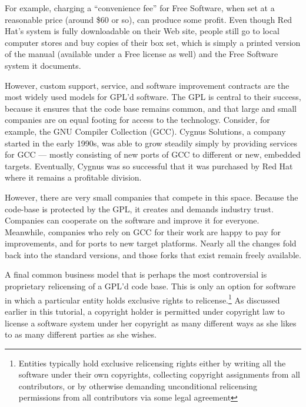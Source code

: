 For example, charging a ``convenience fee'' for Free Software,
when set at a reasonable price (around \$60 or so), can produce some
profit. Even though Red Hat's system is fully downloadable on their
Web site, people still go to local computer stores and buy copies of their
box set, which is simply a printed version of the manual (available under
a Free license as well) and the Free Software system it documents.

\medskip

However, custom support, service, and software improvement contracts
are the most widely used models for GPL'd software. The GPL is
central to their success, because it ensures that the code base
remains common, and that large and small companies are on equal
footing for access to the technology. Consider, for example, the GNU
Compiler Collection (GCC). Cygnus Solutions, a company started in the
early 1990s, was able to grow steadily simply by providing services
for GCC --- mostly consisting of new ports of GCC to different or new,
embedded targets. Eventually, Cygnus was so successful that
it was purchased by Red Hat where it remains a profitable division.

However, there are very small companies that compete in
this space. Because the code-base is protected by the GPL, it creates and
demands industry trust. Companies can cooperate on the software and
improve it for everyone. Meanwhile, companies who rely on GCC for their
work are happy to pay for improvements, and for ports to new target
platforms. Nearly all the changes fold back into the standard
versions, and those forks that exist remain freely available.

\medskip

\label{Proprietary Relicensing}

A final common business model that is perhaps the most controversial is
proprietary relicensing of a GPL'd code base. This is only an option for
software in which a particular entity holds exclusive rights to
relicense.\footnote{Entities typically hold exclusive relicensing rights
  either by writing all the software under their own copyrights, collecting
  copyright assignments from all contributors, or by otherwise demanding
  unconditional relicensing permissions from all contributors via some legal
  agreement} As discussed earlier in this tutorial, a copyright holder is
permitted under copyright law to license a software system under her
copyright as many different ways as she likes to as many different parties as
she wishes.

